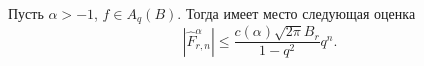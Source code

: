 
\begin{lemma} Пусть $\alpha>-1$, $f\in A_q(B)$. Тогда имеет место следующая оценка
 \begin{equation}\label{5.44}
|\hat F^\alpha_{r,n}|\le \frac{c(\alpha)\sqrt{2\pi}B_r}{1-q^2}q^n.
 \end{equation}
\end{lemma}


